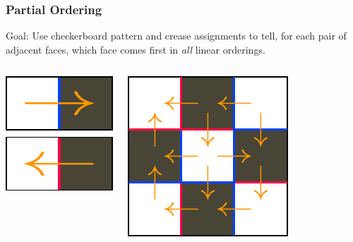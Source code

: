 \documentclass{beamer}
\begin{document}

\begin{frame}
\frametitle{Partial Ordering}
\begin{block}{Goal:}
Use checkerboard pattern and crease assignments to tell, for each pair of adjacent faces, which face comes first in \textit{all} linear orderings.
\end{block}

\bigskip

\begin{columns}[c]

\includegraphics[width=.8\textwidth]{sam_images/checkerboard-tiles.pdf}

\includegraphics[width=\textwidth]{sam_images/cp-w-cboard-and-dag.pdf}

\end{columns}

\end{frame}
\end{document}
